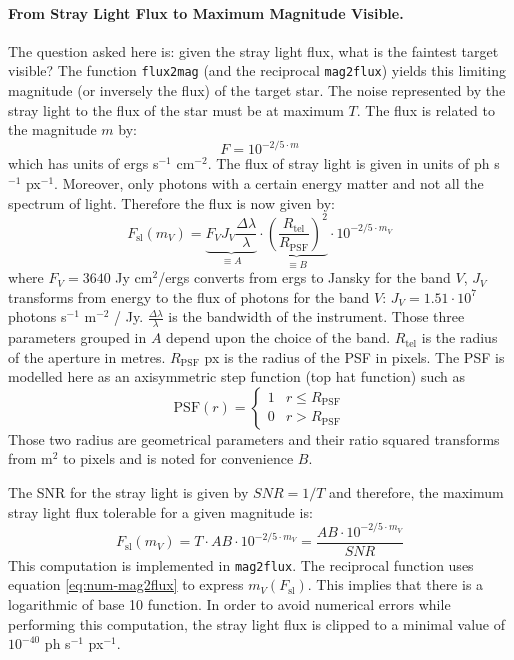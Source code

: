 \documentclass[a4paper,10pt]{article}
\newcommand{\httplink}[1]{{\href{#1}{#1}}}
\newcommand{\todo}[1]{\textbf{{\color{red}#1}}}
\begin{document}
\paragraph{From Stray Light Flux to Maximum Magnitude Visible.} 
The question asked here is: given the stray light flux, what is the faintest target visible? The function \verb=flux2mag= (and the reciprocal \verb=mag2flux=) yields this limiting magnitude (or inversely the flux) of the target star. The noise represented by the stray light to the flux of the star must be at maximum $T$. The flux is related to the magnitude $m$ by:
\begin{equation}
 F = 10^{-2/5\cdot m}
\end{equation}
which has units of ergs s$^{-1}$ cm$^{-2}$. The flux of stray light is given in units of ph s$^{-1}$ px$^{-1}$. Moreover, only photons with a certain energy matter and not all the spectrum of light. Therefore the flux is now given by:
\begin{equation}
 F_\text{sl}(m_V) = \underbrace{F_V J_V\frac{\Delta \lambda}{\lambda}}_{\equiv A}\cdot\underbrace{\left(\frac{R_\text{tel}}{R_\text{PSF}}\right)^2}_{\equiv B}\cdot10^{-2/5\cdot m_V}
\end{equation}
where $F_V = 3640$ Jy cm$^2$/ergs converts from ergs to Jansky for the band $V$, $J_V$ transforms from energy to the flux of photons for the band $V$: $J_V=1.51\cdot10^7$ photons s$^{-1}$ m$^{-2}$ / Jy. $\frac{\Delta \lambda}{\lambda}$ is the bandwidth of the instrument. Those three parameters grouped in $A$ depend upon the choice of the band. $R_\text{tel}$ is the radius of the aperture in metres. $R_\text{PSF}$ px is the radius of the PSF in pixels. The PSF is modelled here as an axisymmetric step function (top hat function) such as 
\begin{equation} \label{eq:modelled-PSF}
 \text{PSF}(r) = \begin{cases} 1 & r\leq R_\text{PSF}\\
			     0 & r>R_\text{PSF}
              \end{cases}
\end{equation}
Those two radius are geometrical parameters and their ratio squared transforms from m$^2$ to pixels and is noted for convenience $B$.

The SNR for the stray light is given by $SNR=1/T$ and therefore, the maximum stray light flux tolerable for a given magnitude is:
\begin{equation} \label{eq:num-mag2flux}
 F_\text{sl}(m_V) = T\cdot AB\cdot10^{-2/5\cdot m_V}=\frac{AB\cdot10^{-2/5\cdot m_V}}{SNR}
\end{equation}
This computation is implemented in \verb=mag2flux=. The reciprocal function uses equation \ref{eq:num-mag2flux} to express $m_V(F_\text{sl})$. This implies that there is a logarithmic of base 10 function. In order to avoid numerical errors while performing this computation, the stray light flux is clipped to a minimal value of $10^{-40}$ ph s$^{-1}$ px$^{-1}$. 
\end{document}
